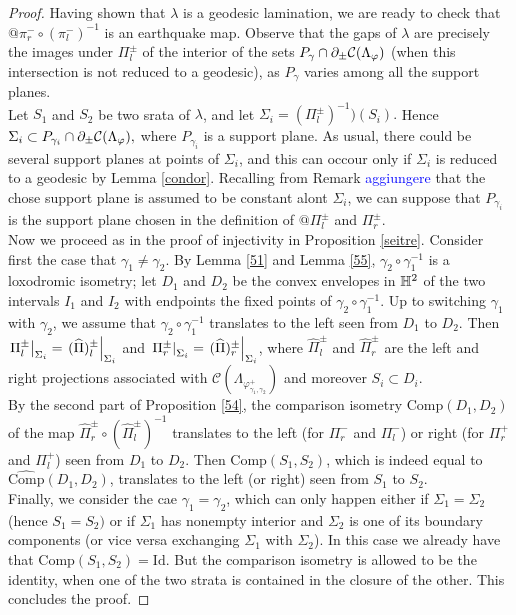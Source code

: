 \begin{proof}
    Having shown that $\lambda$ is a geodesic lamination, we are ready to check that $@\pi_r^-\circ(\pi_l^-)^{-1}$ is an earthquake map. Observe that the gaps of $\lambda$ are precisely the images under $\Pi_l^\pm$ of the interior of the sets $P_\gamma\cap\partial_\pm\mathcal{C}(\Lambda_\varphi)$ (when this intersection is not reduced to a geodesic), as $P_\gamma$ varies among all the support planes. \\
    Let $S_1$ and $S_2$ be two srata of $\lambda$, and let $\Sigma_i=(\Pi_l^\pm)^{-1})(S_i).$ Hence $\Sigma_i\subset P_{\gamma_i}\cap\partial_\pm\mathcal{C}(\Lambda_\varphi),$ where $P_{\gamma_i}$ is a support plane. As usual, there could be several support planes at points of $\Sigma_i$, and this can occour only if $\Sigma_i$ is reduced to a geodesic by Lemma \ref{condor}. Recalling from Remark \textcolor{blue}{aggiungere}  that the chose support plane is assumed to be constant alont $\Sigma_i$, we can suppose that $P_{\gamma_i}$ is the support plane chosen in the definition of $@\Pi_l^\pm$ and $\Pi_r^\pm$.\\
    Now we proceed as in the proof of injectivity in Proposition \ref{seitre}. Consider first the case that $\gamma_1\neq\gamma_2$. By Lemma \ref{51} and Lemma \ref{55}, $\gamma_2\circ\gamma_1^{-1}$ is a loxodromic isometry; let $D_1$ and $D_2$ be the convex envelopes in $\mathbb{H}^2$ of the two intervals $I_1$ and $I_2$ with endpoints the fixed points of $\gamma_2\circ\gamma_1^{-1}.$ Up to switching $\gamma_1$ with $\gamma_2$, we assume that $\gamma_2\circ\gamma_1^{-1}$ translates to the left seen from $D_1$ to $D_2$. Then $\left.\Pi_l^\pm\right|_{\Sigma_i}=\left.(\widehat{\Pi})_l^\pm\right|_{\Sigma_i}$ and $\left.\Pi_r^\pm\right|_{\Sigma_i}=\left.(\widehat{\Pi})_r^\pm\right|_{\Sigma_i}$, where $\widehat{\Pi}_l^\pm$ and $\widehat{\Pi}_r^\pm$ are the left and right projections associated with $\mathcal{C}(\Lambda_{\varphi_{\gamma_1,\gamma_2}^+})$ and moreover $S_i\subset D_i$.\\
    By the second part of Proposition \ref{54}, the comparison isometry $\widehat{\text{Comp}}(D_1,D_2)$ of the map $\widehat{\Pi}_r^\pm\circ(\widehat{\Pi}_l^\pm)^{-1}$ translates to the left (for $\Pi_r^-$ and $\Pi_l^-$) or right (for $\Pi_r^+$ and $\Pi_l^+$) seen from $D_1$ to $D_2$. Then $\text{Comp}(S_1,S_2)$, which is indeed equal to $\widehat{\text{Comp}}(D_1,D_2)$, translates to the left (or right) seen from $S_1$ to $S_2.$\\
    Finally, we consider the cae $\gamma_1=\gamma_2$, which can only happen either if $\Sigma_1=\Sigma_2$ (hence $S_1=S_2)$ or if $\Sigma_1$ has nonempty interior and $\Sigma_2$ is one of its boundary components (or vice versa exchanging $\Sigma_1$ with $\Sigma_2$). In this case we already have that $\text{Comp}(S_1,S_2)=\text{Id}$. But the comparison isometry is allowed to be the identity, when one of the two strata is contained in the closure of the other. This concludes the proof. 
\end{proof}

